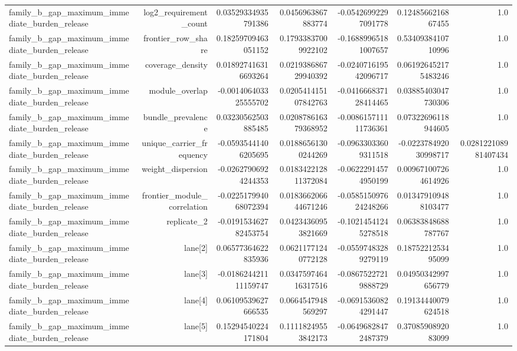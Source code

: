 {\begin{longtable}{lrrrrrr}
family\_b\_gap\_maximum\_immediate\_burden\_release & log2\_requirement\_count & 0.03529334935791386 & 0.0456963867883774 & -0.05426992297091778 & 0.1248566216867455 & 1.0 \\
family\_b\_gap\_maximum\_immediate\_burden\_release & frontier\_row\_share & 0.18259709463051152 & 0.17933837009922102 & -0.16889965181007657 & 0.5340938410710996 & 1.0 \\
family\_b\_gap\_maximum\_immediate\_burden\_release & coverage\_density & 0.018927416316693264 & 0.021938686729940392 & -0.024071619542096717 & 0.061926452175483246 & 1.0 \\
family\_b\_gap\_maximum\_immediate\_burden\_release & module\_overlap & -0.001406403325555702 & 0.020541415107842763 & -0.041666837128414465 & 0.03885403047730306 & 1.0 \\
family\_b\_gap\_maximum\_immediate\_burden\_release & bundle\_prevalence & 0.03230562503885485 & 0.020878616379368952 & -0.008615711111736361 & 0.07322696118944605 & 1.0 \\
family\_b\_gap\_maximum\_immediate\_burden\_release & unique\_carrier\_frequency & -0.05935441406205695 & 0.01886561300244269 & -0.09633033609311518 & -0.022378492030998717 & 0.028122108981407434 \\
family\_b\_gap\_maximum\_immediate\_burden\_release & weight\_dispersion & -0.02627906924244353 & 0.018342212811372084 & -0.06222914574950199 & 0.009671007264614926 & 1.0 \\
family\_b\_gap\_maximum\_immediate\_burden\_release & frontier\_module\_correlation & -0.022517994068072394 & 0.018366206644671246 & -0.058515097624248266 & 0.013479109488103477 & 1.0 \\
family\_b\_gap\_maximum\_immediate\_burden\_release & replicate\_2 & -0.019153462782453754 & 0.04234360953821669 & -0.10214541245278518 & 0.06383848688787767 & 1.0 \\
family\_b\_gap\_maximum\_immediate\_burden\_release & lane[2] & 0.06577364622835936 & 0.06211771240772128 & -0.05597483289279119 & 0.1875221253495099 & 1.0 \\
family\_b\_gap\_maximum\_immediate\_burden\_release & lane[3] & -0.018624421111159747 & 0.034759746416317516 & -0.08675227219888729 & 0.04950342997656779 & 1.0 \\
family\_b\_gap\_maximum\_immediate\_burden\_release & lane[4] & 0.06109539627666535 & 0.0664547948569297 & -0.06915360824291447 & 0.19134440079624518 & 1.0 \\
family\_b\_gap\_maximum\_immediate\_burden\_release & lane[5] & 0.15294540224171804 & 0.11118249553842173 & -0.06496828472487379 & 0.3708590892083099 & 1.0 \\

\end{longtable}}
